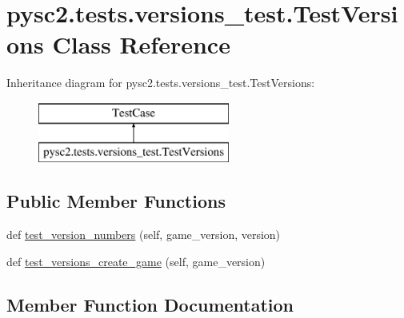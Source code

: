 \hypertarget{classpysc2_1_1tests_1_1versions__test_1_1_test_versions}{}\section{pysc2.\+tests.\+versions\+\_\+test.\+Test\+Versions Class Reference}
\label{classpysc2_1_1tests_1_1versions__test_1_1_test_versions}
Inheritance diagram for pysc2.\+tests.\+versions\+\_\+test.\+Test\+Versions\+:\begin{figure}[H]
\begin{center}
\leavevmode
\includegraphics[height=2.000000cm]{classpysc2_1_1tests_1_1versions__test_1_1_test_versions}
\end{center}
\end{figure}
\subsection*{Public Member Functions}
\begin{DoxyCompactItemize}
\item 
def \mbox{\hyperlink{classpysc2_1_1tests_1_1versions__test_1_1_test_versions_a658ad1f72237553f8ed664c9cdd5e79f}{test\+\_\+version\+\_\+numbers}} (self, game\+\_\+version, version)
\item 
def \mbox{\hyperlink{classpysc2_1_1tests_1_1versions__test_1_1_test_versions_a55ee9f281b391b975b80e4f91efabbd9}{test\+\_\+versions\+\_\+create\+\_\+game}} (self, game\+\_\+version)
\end{DoxyCompactItemize}


\subsection{Member Function Documentation}
\mbox{\label{classpysc2_1_1tests_1_1versions__test_1_1_test_versions_a658ad1f72237553f8ed664c9cdd5e79f}} 
